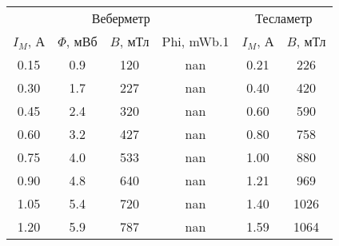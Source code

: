 \begin{tabular}{cccccc}
\toprule
\multicolumn{4}{c}{Веберметр} & \multicolumn{2}{c}{Тесламетр} \\
$I_M$, А & $\Phi$, мВб & $B$, мТл & Phi, mWb.1 & $I_M$, А & $B$, мТл \\
\midrule
0.15 & 0.9 & 120 & nan & 0.21 & 226 \\
0.30 & 1.7 & 227 & nan & 0.40 & 420 \\
0.45 & 2.4 & 320 & nan & 0.60 & 590 \\
0.60 & 3.2 & 427 & nan & 0.80 & 758 \\
0.75 & 4.0 & 533 & nan & 1.00 & 880 \\
0.90 & 4.8 & 640 & nan & 1.21 & 969 \\
1.05 & 5.4 & 720 & nan & 1.40 & 1026 \\
1.20 & 5.9 & 787 & nan & 1.59 & 1064 \\
\bottomrule
\end{tabular}
